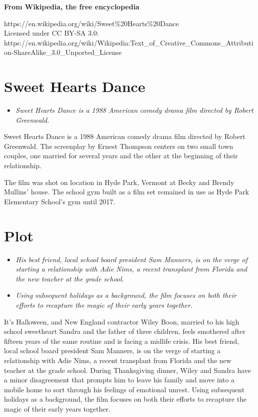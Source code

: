\textbf{From Wikipedia, the free encyclopedia}

https://en.wikipedia.org/wiki/Sweet\%20Hearts\%20Dance\\
Licensed under CC BY-SA 3.0:\\
https://en.wikipedia.org/wiki/Wikipedia:Text\_of\_Creative\_Commons\_Attribution-ShareAlike\_3.0\_Unported\_License

\section{Sweet Hearts Dance}\label{sweet-hearts-dance}

\begin{itemize}
\item
  \emph{Sweet Hearts Dance is a 1988 American comedy drama film directed
  by Robert Greenwald.}
\end{itemize}

Sweet Hearts Dance is a 1988 American comedy drama film directed by
Robert Greenwald. The screenplay by Ernest Thompson centers on two small
town couples, one married for several years and the other at the
beginning of their relationship.

The film was shot on location in Hyde Park, Vermont at Becky and Brendy
Mullins' house. The school gym built as a film set remained in use as
Hyde Park Elementary School's gym until 2017.

\section{Plot}\label{plot}

\begin{itemize}
\item
  \emph{His best friend, local school board president Sam Manners, is on
  the verge of starting a relationship with Adie Nims, a recent
  transplant from Florida and the new teacher at the grade school.}
\item
  \emph{Using subsequent holidays as a background, the film focuses on
  both their efforts to recapture the magic of their early years
  together.}
\end{itemize}

It's Halloween, and New England contractor Wiley Boon, married to his
high school sweetheart Sandra and the father of three children, feels
smothered after fifteen years of the same routine and is facing a
midlife crisis. His best friend, local school board president Sam
Manners, is on the verge of starting a relationship with Adie Nims, a
recent transplant from Florida and the new teacher at the grade school.
During Thanksgiving dinner, Wiley and Sandra have a minor disagreement
that prompts him to leave his family and move into a mobile home to sort
through his feelings of emotional unrest. Using subsequent holidays as a
background, the film focuses on both their efforts to recapture the
magic of their early years together.

